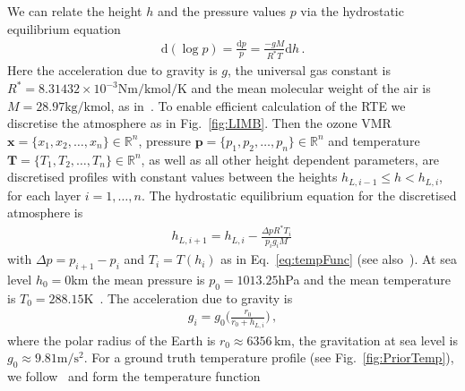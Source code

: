 We can relate the height $h$ and the pressure values $p$ via the hydrostatic equilibrium equation
\begin{align}
	\text{d}(\log p) = \frac{\text{d}p}{p} = \frac{- g M}{R^* T} \text{d} h \, .\label{eq:hydr}
\end{align}
Here the acceleration due to gravity is $g$, the universal gas constant is $R^* = 8.31432 \times 10^{-3} \text{Nm} / \text{kmol} / \text{K}$ and the mean molecular weight of the air is $M = 28.97 \text{kg/kmol}$, as in~\cite{atmosphere1976us}.
To enable efficient calculation of the RTE we discretise the atmosphere as in Fig.~\ref{fig:LIMB}.
Then the ozone VMR $\bm{x} =\{x_1,x_2,\ldots,x_n\} \in \mathbb{R}^{n}$, pressure $\bm{p} =\{p_1,p_2,\ldots,p_n\} \in \mathbb{R}^{n}$ and temperature $\bm{T} =\{T_1,T_2,\ldots,T_n\} \in \mathbb{R}^{n}$, as well as all other height dependent parameters, are discretised profiles with constant values between the heights $h_{L,i-1} \leq h < h_{L,i}$, for each layer $i = 1,\dots, n$.
The hydrostatic equilibrium equation for the discretised atmosphere is
\begin{align}
	h_{L,i+1} =  h_{L,i} - \frac{\Delta p R^* T_i  }{p_i  g_i M} \, 
\end{align}
with $\Delta p = p_{i+1} - p_{i}$ and $T_i = T(h_i)$ as in Eq.~\ref{eq:tempFunc} (see also~\cite{Carlotti99,Ridolfi00}).
At sea level $h_0 = 0$km the mean pressure is $p_0 = 1013.25$hPa and the mean temperature is $T_0 = 288.15$K~\cite{atmosphere1976us}.
The acceleration due to gravity is
\begin{align}
	g_i = g_0 \Bigg( \frac{r_0}{r_0 + h_{L,i}} \Bigg) \, ,
\end{align}
where the polar radius of the Earth is $r_0 \approx 6356 \, \text{km}$, the gravitation at sea level is $g_0 \approx 9.81 \text{m}/\text{s}^2$.
For a ground truth temperature profile (see Fig.~\ref{fig:PriorTemp}), we follow~\cite{atmosphere1976us} and form the temperature function
